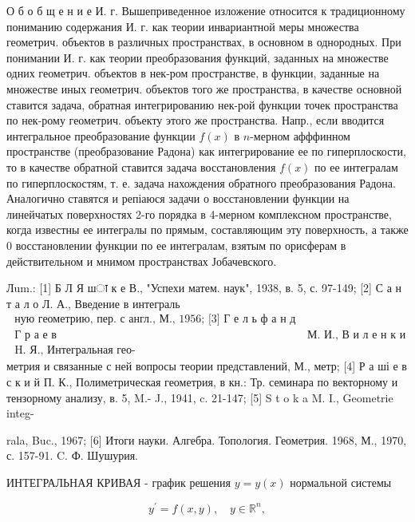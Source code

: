 \documentclass[10pt]{article}
\begin{document}
О б о б щ е н и е И. г. Вышеприведенное изложение относится к традиционному пониманию содержания И. г. как теории инвариантной меры множества геометрич. объектов в различных пространствах, в основном в однородных. При понимании И. г. как теории преобразования функций, заданных на множестве одних геометрич. объектов в нек-ром пространстве, в функции, заданные на множестве иных геометрич. объектов того же пространства, в качестве основной ставится задача, обратная интегрированию нек-рой функции точек пространства по нек-рому геометрич. объекту этого же пространства. Напр., если вводится интегральное преобразование функции $f(x)$ в $n$-мерном афффинном пространстве (преобразование Радона) как интегрирование ее по гиперплоскости, то в качестве обратной ставится задача восстановления $f(x)$ по ее интегралам по гиперплоскостям, т. е. задача нахождения обратного преобразования Радона. Аналогично ставятся и репіаюся задачи о восстановлении функции на линейчатых поверхностях 2-го порядка в 4-мерном комплексном пространстве, когда известны ее интегралы по прямым, составляющим эту поверхность, а также 0 восстановлении функции по ее интегралам, взятым по орисферам в действительном и мнимом пространствах Јобачевского.



Лum.: [1] Б Л Я шा к е В., "Успехи матем. наук", 1938, в. 5, с. 97-149; [2] С а н т а л о Л. А., Введение в интеграль$\begin{array}{ll}\text { ную геометрию, пер. с англ., М., 1956; [3] Г е л ь ф а н д И. М., } \\ \text { Г р а е в } & \text { М. И., В и л е н к и н } \\ \text { H. Я., Интегральная гео- }\end{array}$ метрия и связанные с ней вопросы теории представлений, М., метр; [4] Р а ші е в с к и й П. К., Полиметрическая геометрия, в кн.: Тр. семинара по векторному и тензорному анализу, в. 5, M.- J., 1941, c. 21-147; [5] S t o k a M. I., Geometrie integ-

rala, Buc., 1967; [6] Итоги науки. Алгебра. Топология. Геометрия. 1968, М., 1970, с. 157-91. C. Ф. Шушурия.



ИНТЕГРАЛЬНАЯ КРИВАЯ - график решения $y=y(x)$ нормальной системы



\[

y^{\prime}=f(x, y), \quad y \in \mathbb{R}^{n},

\]
\end{document}
